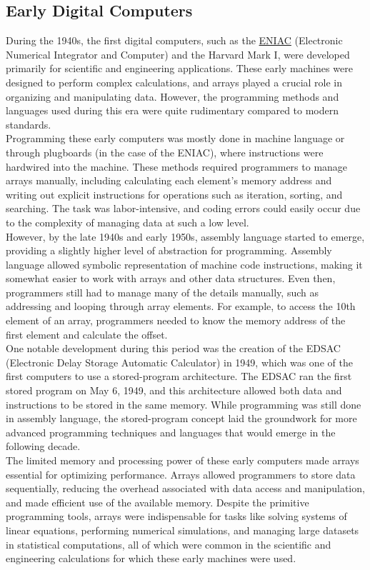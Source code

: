 \documentclass[12pt, oneside]{book}
\begin{document}
	\subsection{Early Digital Computers}
	During the 1940s, the first digital computers, such as the \href{https://en.wikipedia.org/wiki/ENIAC}{ENIAC} (Electronic Numerical Integrator and Computer) and the Harvard Mark I, were developed primarily for scientific and engineering applications. These early machines were designed to perform complex calculations, and arrays played a crucial role in organizing and manipulating data. However, the programming methods and languages used during this era were quite rudimentary compared to modern standards.\\Programming these early computers was mostly done in machine language or through plugboards (in the case of the ENIAC), where instructions were hardwired into the machine. These methods required programmers to manage arrays manually, including calculating each element's memory address and writing out explicit instructions for operations such as iteration, sorting, and searching. The task was labor-intensive, and coding errors could easily occur due to the complexity of managing data at such a low level.\\However, by the late 1940s and early 1950s, assembly language started to emerge, providing a slightly higher level of abstraction for programming. Assembly language allowed symbolic representation of machine code instructions, making it somewhat easier to work with arrays and other data structures. Even then, programmers still had to manage many of the details manually, such as addressing and looping through array elements. For example, to access the 10th element of an array, programmers needed to know the memory address of the first element and calculate the offset.  \\One notable development during this period was the creation of the EDSAC (Electronic Delay Storage Automatic Calculator) in 1949, which was one of the first computers to use a stored-program architecture. The EDSAC ran the first stored program on May 6, 1949, and this architecture allowed both data and instructions to be stored in the same memory. While programming was still done in assembly language, the stored-program concept laid the groundwork for more advanced programming techniques and languages that would emerge in the following decade.\\The limited memory and processing power of these early computers made arrays essential for optimizing performance. Arrays allowed programmers to store data sequentially, reducing the overhead associated with data access and manipulation, and made efficient use of the available memory. Despite the primitive programming tools, arrays were indispensable for tasks like solving systems of linear equations, performing numerical simulations, and managing large datasets in statistical computations, all of which were common in the scientific and engineering calculations for which these early machines were used.
\end{document}
